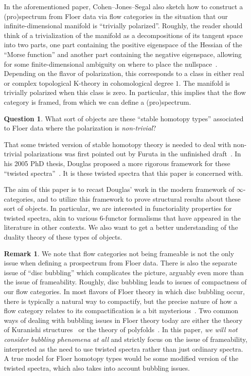 \documentclass[10pt]{amsart}
\theoremstyle{plain}
\theoremstyle{definition}
\newtheorem{question}[theorem]{Question}
\newtheorem{rmk}[theorem]{Remark}
\begin{document}
In the aforementioned paper, Cohen--Jones--Segal also sketch how to construct a (pro)spectrum from Floer data via flow categories in the situation that our infinite-dimensional manifold is ``trivially polarized''.
Roughly, the reader should think of a trivialization of the manifold as a decompositions of its tangent space into two parts, one part containing the positive eigenspace of the Hessian of the ``Morse function'' and another part containing the negative eigenspace, allowing for some finite-dimensional ambiguity on where to place the nullspace~\cite{CJS95,Dou05,PS86}.
Depending on the flavor of polarization, this corresponds to a class in either real or complex topological K-theory in cohomological degree $1$.
The manifold is trivially polarized when this class is zero.
In particular, this implies that the flow category is framed, from which we can define a (pro)spectrum.

\begin{question}
  What sort of objects are these ``stable homotopy types'' associated to Floer data where the polarization is \emph{non-trivial}?
\end{question}

That some twisted version of stable homotopy theory is needed to deal with non-trivial polarizations was first pointed out by Furuta in the unfinished draft~\cite{furuta-preprint}.
In his 2005 PhD thesis, Douglas proposed a more rigorous framework for these ``twisted spectra''~\cite{Dou05}.
It is these twisted spectra that this paper is concerned with.

The aim of this paper is to recast Douglas' work in the modern framework of $\infty$-categories, and to utilize this framework to prove structural results about these sort of objects.
In particular, we are interested in functoriality properties for twisted spectra, akin to various 6-functor formalisms that have appeared in the literature in other contexts.
We also want to get a better understanding of the duality theory of these types of objects.

\begin{rmk}
  We note that flow categories not being frameable is not the only issue when defining a prospectrum from Floer data.
  There is also the separate issue of ``disc bubbling'' which complicates the picture, arguably even more than the issue of frameability.
  Roughly, disc bubbling leads to issues of compactness of our flow categories.
  In most flavors of Floer theory in which disc bubbling occur, there is typically a natural way to compactify, but the precise nature of how a flow category relates to its compactification is a bit mysterious~\cite{CJS95}.
  Two common ways of dealing with bubbling issues in Floer theory today are either the theory of Kuranishi structures~\cite{FOOO20} or the theory of polyfolds~\cite{HWZ21}.
  In this paper, \emph{we will not consider bubbling phenomena at all} and strictly focus on the issue of frameability, interpreted as the need to use twisted spectra rather than just ordinary spectra.
  A true model for Floer homotopy types would be some modified version of the twisted spectra, which also takes into account bubbling issues.
\end{rmk}
\end{document}

